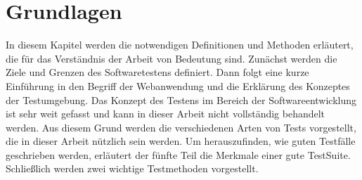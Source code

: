 \chapter{Grundlagen}\label{ch:grundlagen}

In diesem Kapitel werden die notwendigen Definitionen und Methoden erläutert,
die für das Verständnis der Arbeit von Bedeutung sind. Zunächst werden die
Ziele und Grenzen des Softwaretestens definiert. Dann folgt eine kurze
Einführung in den Begriff der Webanwendung und  die Erklärung des
Konzeptes der Testumgebung. Das Konzept des Testens im Bereich der
Softwareentwicklung ist sehr weit gefasst und kann in dieser Arbeit
nicht vollständig behandelt werden. Aus diesem Grund werden die
verschiedenen Arten von Tests vorgestellt, die in dieser Arbeit
nützlich sein werden.  Um herauszufinden, wie guten Testfälle
geschrieben werden, erläutert der fünfte Teil die Merkmale einer
gute \Gls{TestSuite}.  Schließlich werden zwei wichtige
Testmethoden vorgestellt.




